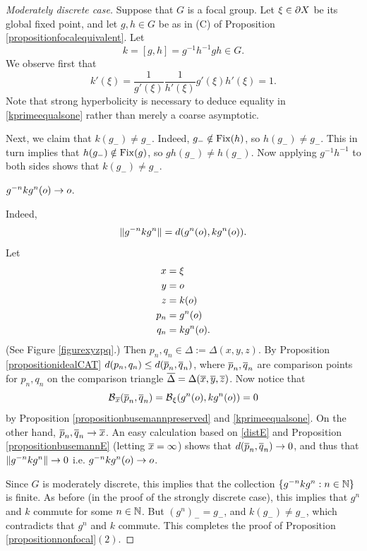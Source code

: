 \begin{proof}[Moderately discrete case]
Suppose that $G$ is a focal group. Let $\xi\in\partial X$ be its global fixed point, and let $g,h\in G$ be as in (C) of Proposition \ref{propositionfocalequivalent}. Let
\[
k = [g,h] = g^{-1} h^{-1} gh\in G.
\]
We observe first that
\begin{equation}
\label{kprimeequalsone}
k'(\xi) = \frac{1}{g'(\xi)}\frac{1}{h'(\xi)}g'(\xi) h'(\xi) = 1.
\end{equation}
Note that strong hyperbolicity is necessary to deduce equality in \eqref{kprimeequalsone} rather than merely a coarse asymptotic.

Next, we claim that $k(g_-)\neq g_-$. Indeed, $g_-\notin\operatorname{Fix}(h)$, so $h(g_-)\neq g_-$. This in turn implies that $h(g_-)\notin\operatorname{Fix}(g)$, so $gh(g_-)\neq h(g_-)$. Now applying $g^{-1} h^{-1}$ to both sides shows that $k(g_-)\neq g_-$.

\begin{claim}
\label{claimfocalMD}
$g^{-n} k g^n(o)\to o$.
\end{claim}
\begin{subproof}
Indeed,
\[
\|g^{-n} k g^n\| = d(g^n(o),k g^n(o)).
\]
Let
\begin{align*}
x &= \xi\\
y &= o\\
z &= k(o)\\
p_n &= g^n(o)\\
q_n &= k g^n(o).
\end{align*}
(See Figure \ref{figurexyzpq}.) Then $p_n,q_n\in\Delta := \Delta(x,y,z)$. By Proposition \ref{propositionidealCAT} $d(p_n,q_n) \leq d(\overline p_n,\overline q_n)$, where $\overline p_n,\overline q_n$ are comparison points for $p_n,q_n$ on the comparison triangle $\overline \Delta = \Delta(\overline x,\overline y,\overline z)$. Now notice that
\[
\operatorname{\mathcal B}_{\overline x}(\overline p_n,\overline q_n) = \operatorname{\mathcal B}_\xi(g^n(o),k g^n(o)) = 0
\]
by Proposition \ref{propositionbusemannpreserved} and \eqref{kprimeequalsone}. On the other hand, $\overline p_n,\overline q_n\to \overline x$. An easy calculation based on \eqref{distE} and Proposition \ref{propositionbusemannE} (letting $\overline x = \infty$) shows that $d(\overline p_n,\overline q_n)\to 0$, and thus that $\|g^{-n} k g^n\|\to 0$ i.e. $g^{-n} k g^n(o)\to o$.
\end{subproof}
Since $G$ is moderately discrete, this implies that the collection $\{g^{-n} k g^n:n\in\N\}$ is finite. As before (in the proof of the strongly discrete case), this implies that $g^n$ and $k$ commute for some $n\in\N$. But $(g^n)_- = g_-$, and $k(g_-) \neq g_-$, which contradicts that $g^n$ and $k$ commute. This completes the proof of Proposition \ref{propositionnonfocal}$(2)$.
\end{proof}

